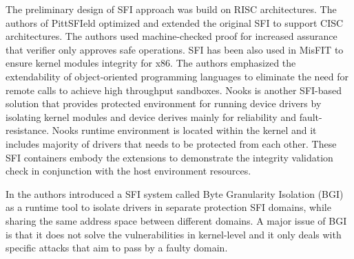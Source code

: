 The preliminary design of SFI approach was build on RISC
architectures. The authors of PittSFIeld \cite{PittSFIeld} optimized and
extended the original SFI to support CISC architectures. 
The authors used machine-checked proof for increased assurance that
verifier only approves safe operations.
%
SFI has been also used in MisFIT \cite{MISFit} to ensure kernel
modules integrity for x86. The authors emphasized the
extendability of object-oriented programming languages to eliminate
the need for remote calls to achieve high throughput sandboxes. 
%
Nooks \cite{Nooks:03} is another SFI-based solution that provides
protected environment for running device drivers by isolating kernel
modules and device derives mainly for reliability and
fault-resistance. Nooks runtime environment is located within the
kernel and it includes majority of drivers that needs to be protected
from each other. 
These SFI containers embody the extensions to demonstrate the integrity
validation check in conjunction with the host environment resources.

In \cite{Castro-BGI} the authors introduced a SFI system called Byte
Granularity Isolation (BGI) as a runtime tool to isolate drivers in
separate protection SFI domains, while sharing the same address space
between different domains. 
A major issue of BGI is that it
does not solve the vulnerabilities in kernel-level and it only deals
with specific attacks that aim to pass by a faulty domain.

